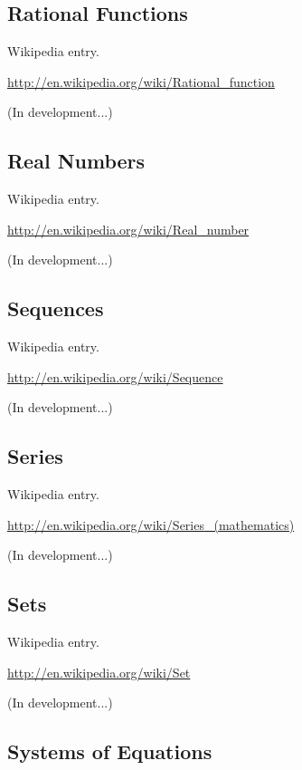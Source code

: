 \documentclass[12pt,twoside]{book}
\begin{document}
\subsection[Rational Functions]{Rational Functions}

Wikipedia entry.

\href{http://en.wikipedia.org/wiki/Rational_function}{http://en.wikipedia.org/wiki/Rational\_function}

(In development...)

\subsection[Real Numbers]{Real Numbers}

Wikipedia entry.

\href{http://en.wikipedia.org/wiki/Real_number}{http://en.wikipedia.org/wiki/Real\_number}

(In development...)

\subsection[Sequences]{Sequences}

Wikipedia entry.

\href{http://en.wikipedia.org/wiki/Sequence}{http://en.wikipedia.org/wiki/Sequence}

(In development...)

\subsection[Series]{Series}

Wikipedia entry.

\href{http://en.wikipedia.org/wiki/Series_(mathematics)}{http://en.wikipedia.org/wiki/Series\_(mathematics)}

(In development...)

\subsection[Sets]{Sets}

Wikipedia entry.

\href{http://en.wikipedia.org/wiki/Set}{http://en.wikipedia.org/wiki/Set}

(In development...)

\subsection[Systems of Equations]{Systems of Equations}
\end{document}
